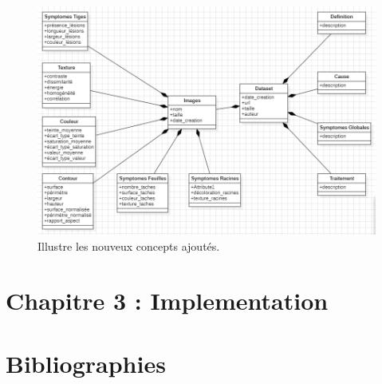 \documentclass{article}
\begin{document}
	\begin{figure}[H]
		\begin{center}
			\begin{minipage}[b]{1\textwidth}
				\centering
				\includegraphics[width=\textwidth]{img/Diagramme.png}
			\end{minipage}
			\caption{Illustre les nouveux concepts ajoutés.}
		\end{center}
	\end{figure}
	
	\section{Chapitre 3 : Implementation}
	
	\newpage
	\section{Bibliographies}
	
	
\end{document}

